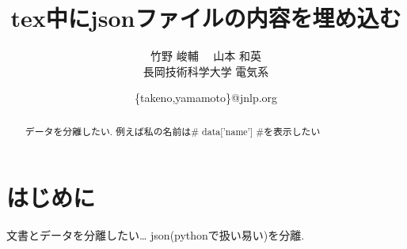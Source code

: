 \documentclass[twocolumn,uplatex]{jsarticle}
\begin{document}
\title{tex中にjsonファイルの内容を埋め込む} 
\author{
    竹野 峻輔 \, \, 山本 和英
    \\ 長岡技術科学大学 電気系
}
\date{\{takeno,yamamoto\}@jnlp.org} 
\maketitle
\begin{abstract}
    データを分離したい.
    例えば私の名前は{# data['name'] #}を表示したい

\end{abstract}


\section{はじめに}
文書とデータを分離したい…
json(pythonで扱い易い)を分離.
\end{document}
